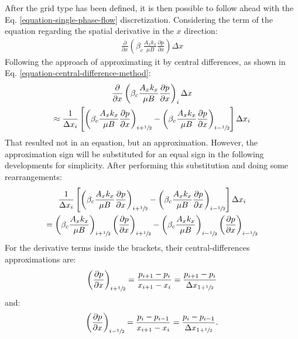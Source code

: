 After the grid type has been defined, it is then possible to follow ahead with the Eq. \ref{equation-single-phase-flow} discretization.
%
Considering the term of the equation regarding the spatial derivative in the $x$ direction:
%
\begin{align}
	\label{equation-spatial-derivative-term}
	\frac{\partial}{\partial x}\left( \beta_c \frac{A_x k_x}{\mu B}\frac{\partial p}{\partial x}\right) \Delta x
\end{align}
%
Following the \cite{Ertekin2001} approach of approximating it by central differences, as shown in Eq. \ref{equation-central-difference-method}:
%
\begin{multline}
	\label{equation-spatial-derivative-approximation}
	\frac{\partial}{\partial x}\left( \beta_c \frac{A_x k_x}{\mu B}\frac{\partial p}{\partial x}\right)_i \Delta x \\ \approx \frac{1}{\Delta x_i} \left[ \left( \beta_c \frac{A_x k_x}{\mu B}\frac{\partial p}{\partial x}\right)_{i+\sfrac{1}{2}} - \left( \beta_c \frac{A_x k_x}{\mu B}\frac{\partial p}{\partial x}\right)_{i-\sfrac{1}{2}}\right] \Delta x_i
\end{multline}
%
That resulted not in an equation, but an approximation.
%
However, the approximation sign will be substituted for an equal sign in the following developments for simplicity.
%
After performing this substitution and doing some rearrangements:
%
\begin{multline}
	\label{equation-spatial-derivative-discretization}
	\frac{1}{\Delta x_i} \left[ \left( \beta_c \frac{A_x k_x}{\mu B}\frac{\partial p}{\partial x}\right)_{i+\sfrac{1}{2}} - \left( \beta_c \frac{A_x k_x}{\mu B}\frac{\partial p}{\partial x}\right)_{i-\sfrac{1}{2}}\right] \Delta x_i \\= \left( \beta_c \frac{A_x k_x}{\mu B}\right)_{i+\sfrac{1}{2}} \left(\frac{\partial p}{\partial x}\right)_{i+\sfrac{1}{2}} - \left( \beta_c \frac{A_x k_x}{\mu B}\right)_{i-\sfrac{1}{2}} \left(\frac{\partial p}{\partial x}\right)_{i-\sfrac{1}{2}}
\end{multline}
%
For the derivative terms inside the brackets, their central-differences approximations are:
%
\begin{align}
	\label{equation-pressure-derivative-i-plus-half}
	\left(\frac{\partial p}{\partial x}\right)_{i+\sfrac{1}{2}}= \frac{p_{i+1}-p_i}{x_{i+1}-x_i}=\frac{p_{i+1}-p_i}{\Delta x_{1+\sfrac{1}{2}}}
\end{align}
%
and:
%
\begin{align}
	\label{equation-pressure-derivative-i-minus-half}
	\left(\frac{\partial p}{\partial x}\right)_{i-\sfrac{1}{2}}= \frac{p_i-p_{i-1}}{x_{i+1}-x_i}=\frac{p_i-p_{i-1}}{\Delta x_{1+\sfrac{1}{2}}} .
\end{align}
